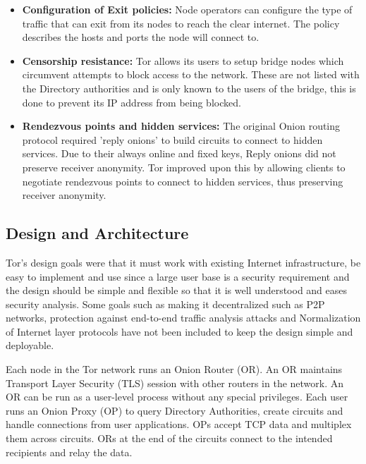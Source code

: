 \documentclass{llncs}
\begin{document}
\begin{itemize}
	\item[]{\textbf{Configuration of Exit policies:} Node operators can configure the type of traffic that can exit from its nodes to reach the clear internet. The policy describes the hosts and ports the node will connect to.}
	\item[]{\textbf{Censorship resistance:} Tor allows its users to setup bridge nodes which circumvent attempts to block access to the network. These are not listed with the Directory authorities and is only known to the users of the bridge, this is done to prevent its IP address from being blocked.}
		\item[]{\textbf{Rendezvous points and hidden services:} The original Onion routing protocol required 'reply onions' to build circuits to connect to hidden services. Due to their always online and fixed keys, Reply onions did not preserve receiver anonymity. Tor improved upon this by allowing clients to negotiate rendezvous points to connect to hidden services, thus preserving receiver anonymity.}
\end{itemize}

\subsection{Design and Architecture}
Tor's design goals were that it must work with existing Internet infrastructure, be easy to implement and use since a large user base is a security requirement and the design should be simple and flexible so that it is well understood and eases security analysis. Some goals such as making it decentralized such as P2P networks, protection against end-to-end traffic analysis attacks and Normalization of Internet layer protocols have not been included to keep the design simple and deployable.

Each node in the Tor network runs an Onion Router (OR). An OR maintains Transport Layer Security (TLS) session with other routers in the network. An OR can be run as a user-level process without any special privileges. Each user runs an Onion Proxy (OP) to query Directory Authorities, create circuits and handle connections from user applications. OPs accept TCP data and multiplex them across circuits. ORs at the end of the circuits connect to the intended recipients and relay the data.
\end{document}

